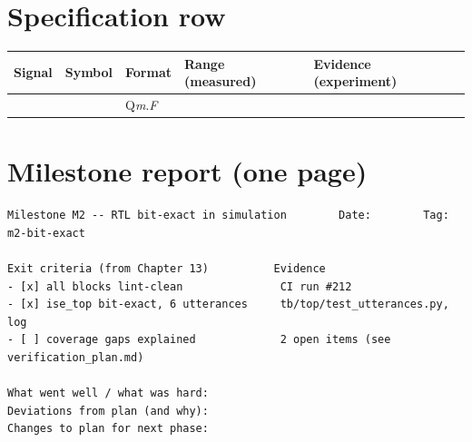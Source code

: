 \section*{Specification row}
\begin{center}\footnotesize
\begin{tabularx}{\textwidth}{@{}llllL@{}}
\toprule
Signal & Symbol & Format & Range (measured) & Evidence (experiment) \\
\midrule
 & & Q\textit{m}.\textit{F} & &  \\
\bottomrule
\end{tabularx}
\end{center}

\section*{Milestone report (one page)}
\begin{lstlisting}[style=plain]
Milestone M2 -- RTL bit-exact in simulation        Date:        Tag: m2-bit-exact

Exit criteria (from Chapter 13)          Evidence
- [x] all blocks lint-clean               CI run #212
- [x] ise_top bit-exact, 6 utterances     tb/top/test_utterances.py, log
- [ ] coverage gaps explained             2 open items (see verification_plan.md)

What went well / what was hard:
Deviations from plan (and why):
Changes to plan for next phase:
\end{lstlisting}
